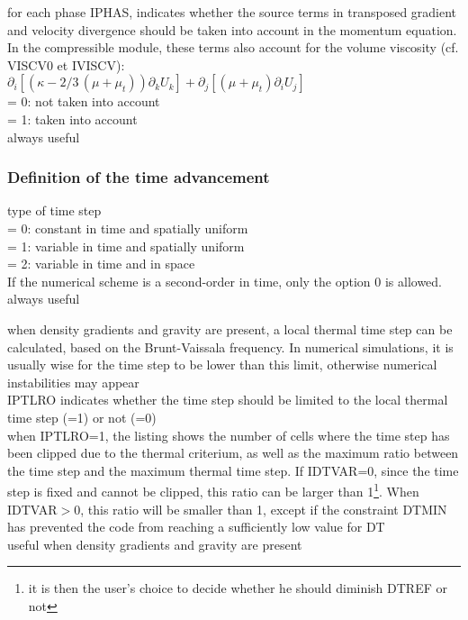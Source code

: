 {for each phase IPHAS, indicates whether the source terms in transposed gradient
and velocity divergence should be taken into account in the momentum
equation. In the compressible module, these terms also account for the volume
viscosity (cf. VISCV0 et IVISCV):\\
$\partial_i \left[(\kappa -2/3\,(\mu+\mu_t))\partial_k U_k  \right]
 +     \partial_j \left[ (\mu+\mu_t)\partial_i U_j \right]$ \\
\hspace*{1.3cm}= 0: not taken into account\\
\hspace*{1.3cm}= 1: taken into account\\
always useful}


\subsubsection{Definition of the time advancement}

{type of time step\\
\hspace*{1.3cm}= 0: constant in time and spatially uniform\\
\hspace*{1.3cm}= 1: variable in time and spatially uniform\\
\hspace*{1.3cm}= 2: variable in time and in space\\
If the numerical scheme is a second-order in time, only the option 0 is
allowed.\\
always useful}

{when density gradients and gravity are present, a local thermal time
step can be calculated, based on the Brunt-Vaissala frequency. In numerical
simulations, it is usually wise for the time step to be lower than this limit,
otherwise numerical instabilities may appear\\
IPTLRO indicates whether the time step should be limited to the local thermal
time step (=1) or not (=0)\\
when IPTLRO=1, the listing shows the number of cells where the time step has
been clipped due to the thermal criterium, as well as the maximum ratio between
the time step and the maximum thermal time step. If IDTVAR=0, since the time
step is fixed and cannot be clipped, this ratio can be larger than
1\footnote{it is then the user's
choice to decide whether he should diminish DTREF or not}. When IDTVAR$>$0, this
ratio will be smaller than 1, except if the constraint DTMIN has prevented the
code from reaching a sufficiently low value for DT\\
useful when density gradients and gravity are present}


